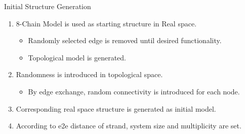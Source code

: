 \begin{columns}[totalwidth=.85\linewidth]
    \column{\textwidth}
    \vspace{-10mm}
        \begin{itembox}[l]{Initial Structure Generation\cite{sasaki}}
            \begin{enumerate}
                \item 8-Chain Model is used as starting structure in \alert{Real space}.
                    \begin{itemize}
                        \normalsize
                        \item Randomly selected edge is removed until desired functionality.
                        \item Topological model is generated. 
                    \end{itemize}
                \item Randomness is introduced in \alert{topological space}.
                    \begin{itemize}
                        \normalsize
                        \item By \alert{edge exchange}, random connectivity is introduced for each node.
                    \end{itemize}	
                \item Corresponding real space structure is generated as initial model.
                \item According to e2e distance of strand, system size and multiplicity are set.
            \end{enumerate}


\end{itembox}
\end{columns}
